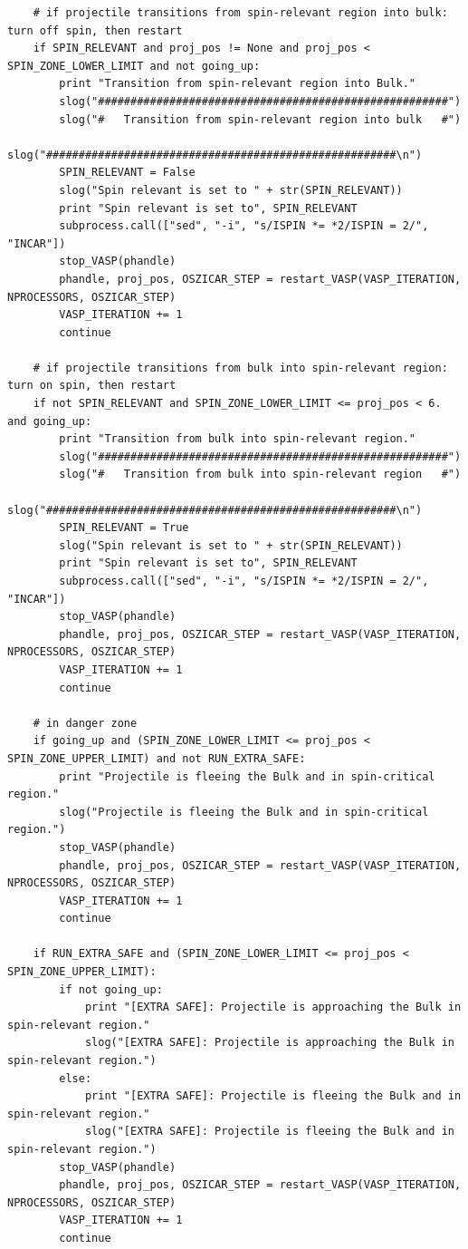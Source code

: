 \documentclass[twoside, 11pt, titlepage, captions=nooneline, a4paper, headsepline]{scrbook}%
\newcommand{\9}{\mathrm}
\newcommand{\0}{\,\mathrm}
\begin{document}
\begin{lstlisting}
    # if projectile transitions from spin-relevant region into bulk: turn off spin, then restart
    if SPIN_RELEVANT and proj_pos != None and proj_pos < SPIN_ZONE_LOWER_LIMIT and not going_up:
        print "Transition from spin-relevant region into Bulk."
        slog("######################################################")
        slog("#   Transition from spin-relevant region into bulk   #")
        slog("######################################################\n")
        SPIN_RELEVANT = False
        slog("Spin relevant is set to " + str(SPIN_RELEVANT))
        print "Spin relevant is set to", SPIN_RELEVANT
        subprocess.call(["sed", "-i", "s/ISPIN *= *2/ISPIN = 2/", "INCAR"])
        stop_VASP(phandle)
        phandle, proj_pos, OSZICAR_STEP = restart_VASP(VASP_ITERATION, NPROCESSORS, OSZICAR_STEP)
        VASP_ITERATION += 1
        continue

    # if projectile transitions from bulk into spin-relevant region: turn on spin, then restart
    if not SPIN_RELEVANT and SPIN_ZONE_LOWER_LIMIT <= proj_pos < 6. and going_up:
        print "Transition from bulk into spin-relevant region."
        slog("######################################################")
        slog("#   Transition from bulk into spin-relevant region   #")
        slog("######################################################\n")
        SPIN_RELEVANT = True
        slog("Spin relevant is set to " + str(SPIN_RELEVANT))
        print "Spin relevant is set to", SPIN_RELEVANT
        subprocess.call(["sed", "-i", "s/ISPIN *= *2/ISPIN = 2/", "INCAR"])
        stop_VASP(phandle)
        phandle, proj_pos, OSZICAR_STEP = restart_VASP(VASP_ITERATION, NPROCESSORS, OSZICAR_STEP)
        VASP_ITERATION += 1
        continue
            
    # in danger zone
    if going_up and (SPIN_ZONE_LOWER_LIMIT <= proj_pos < SPIN_ZONE_UPPER_LIMIT) and not RUN_EXTRA_SAFE:
        print "Projectile is fleeing the Bulk and in spin-critical region."
        slog("Projectile is fleeing the Bulk and in spin-critical region.")
        stop_VASP(phandle)
        phandle, proj_pos, OSZICAR_STEP = restart_VASP(VASP_ITERATION, NPROCESSORS, OSZICAR_STEP)
        VASP_ITERATION += 1
        continue
    
    if RUN_EXTRA_SAFE and (SPIN_ZONE_LOWER_LIMIT <= proj_pos < SPIN_ZONE_UPPER_LIMIT):
        if not going_up:
            print "[EXTRA SAFE]: Projectile is approaching the Bulk in spin-relevant region."
            slog("[EXTRA SAFE]: Projectile is approaching the Bulk in spin-relevant region.")
        else:
            print "[EXTRA SAFE]: Projectile is fleeing the Bulk and in spin-relevant region."
            slog("[EXTRA SAFE]: Projectile is fleeing the Bulk and in spin-relevant region.")
        stop_VASP(phandle)
        phandle, proj_pos, OSZICAR_STEP = restart_VASP(VASP_ITERATION, NPROCESSORS, OSZICAR_STEP)
        VASP_ITERATION += 1
        continue
    

\end{lstlisting}
\end{document}

